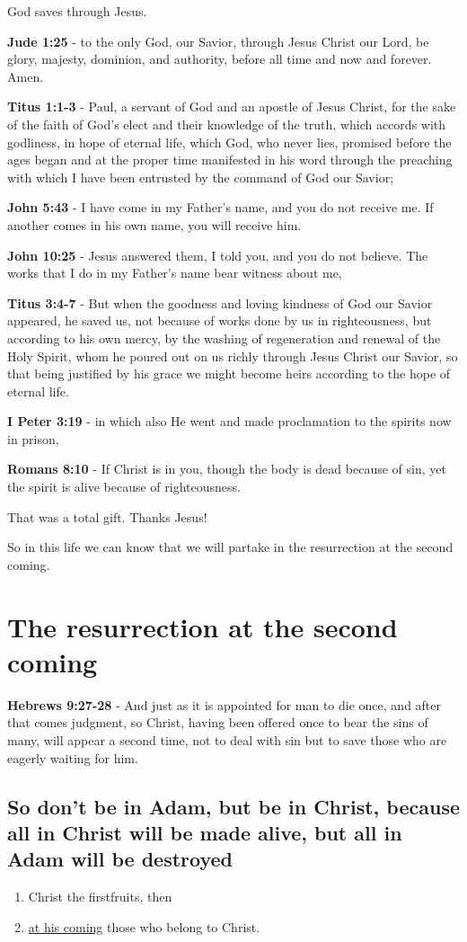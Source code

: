 \documentclass[11pt]{article}
\begin{document}
God saves through Jesus. 

\textbf{Jude 1:25} - to the only God, our Savior, through Jesus Christ our Lord, be glory, majesty, dominion, and authority, before all time and now and forever. Amen.

\textbf{Titus 1:1-3} - Paul, a servant of God and an apostle of Jesus Christ, for the sake of the faith of God's elect and their knowledge of the truth, which accords with godliness, in hope of eternal life, which God, who never lies, promised before the ages began and at the proper time manifested in his word through the preaching with which I have been entrusted by the command of God our Savior;

\textbf{John 5:43} - I have come in my Father's name, and you do not receive me. If another comes in his own name, you will receive him.

\textbf{John 10:25} - Jesus answered them, I told you, and you do not believe. The works that I do in my Father's name bear witness about me,

\textbf{Titus 3:4-7} - But when the goodness and loving kindness of God our Savior appeared, he saved us, not because of works done by us in righteousness, but according to his own mercy, by the washing of regeneration and renewal of the Holy Spirit, whom he poured out on us richly through Jesus Christ our Savior, so that being justified by his grace we might become heirs according to the hope of eternal life.

\textbf{I Peter 3:19} - in which also He went and made proclamation to the spirits now in prison,

\textbf{Romans 8:10} - If Christ is in you, though the body is dead because of sin, yet the spirit is alive because of righteousness.

That was a total gift. Thanks Jesus!

So in this life we can know that we will partake in the resurrection at the second coming.

\section{The resurrection at the second coming}
\label{sec:orgf40e6f0}
\textbf{Hebrews 9:27-28} - And just as it is appointed for man to die once, and after that comes judgment, so Christ, having been offered once to bear the sins of many, will appear a second time, not to deal with sin but to save those who are eagerly waiting for him.

\subsection{So don't be in Adam, but be in Christ, because all in Christ will be made alive, but all in Adam will be destroyed}
\label{sec:orgf5719ff}
\begin{enumerate}
\item Christ the firstfruits, then
\item \uline{at his coming} those who belong to Christ.
\end{enumerate}
\end{document}
